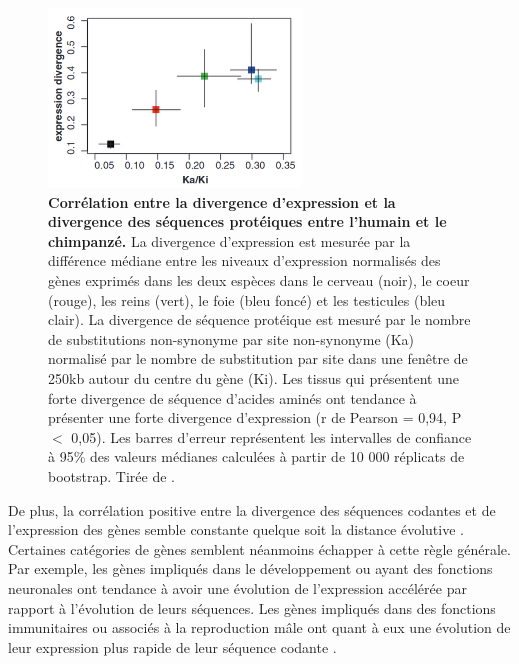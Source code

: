\begin{figure}[h]
 \centering
 \includegraphics[width=0.6\textwidth, page=1] {figures/introduction/fig32.png}
 \caption[Corrélation entre la divergence d'expression et la divergence des séquences protéiques entre l'humain et le chimpanzé.]{
 \textbf{Corrélation entre la divergence d'expression et la divergence des séquences protéiques entre l'humain et le chimpanzé.} La divergence d'expression est mesurée par la différence médiane entre les niveaux d'expression normalisés des gènes exprimés dans les deux espèces dans le cerveau (noir), le coeur (rouge), les reins (vert), le foie (bleu foncé) et les testicules (bleu clair). La divergence de séquence protéique est mesuré par le nombre de substitutions non-synonyme par site non-synonyme (Ka) normalisé par le nombre de substitution par site dans une fenêtre de 250kb autour du centre du gène (Ki). Les tissus qui présentent une forte divergence de séquence d'acides aminés ont tendance à présenter une forte divergence d'expression (r de Pearson = 0,94, P $<$ 0,05). Les barres d'erreur représentent les intervalles de confiance à 95\% des valeurs médianes calculées à partir de 10 000 réplicats de bootstrap. Tirée de \citet{khaitovich_parallel_2005}.\\
 }
 \label{fig:Fig32}
\end{figure}

De plus, la corrélation positive entre la divergence des séquences codantes et de l’expression des gènes semble constante quelque soit la distance évolutive \citep{warnefors_evolution_2013}. Certaines catégories de gènes semblent néanmoins échapper à cette règle générale. Par exemple, les gènes impliqués dans le développement ou ayant des fonctions neuronales ont tendance à avoir une évolution de l’expression accélérée par rapport à l’évolution de leurs séquences. Les gènes impliqués dans des fonctions immunitaires ou associés à la reproduction mâle ont quant à eux une évolution de leur expression plus rapide de leur séquence codante \citep{haygood_contrasts_2010}.

